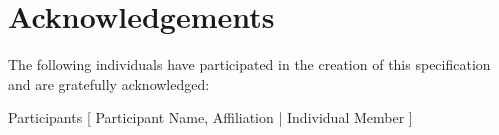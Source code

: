 \chapter{Acknowledgements}

The following individuals have participated in the creation of this specification and are gratefully acknowledged:

\begin{oasistitlesection}{Participants}
	[ Participant Name, Affiliation | Individual Member ] \newline
\end{oasistitlesection}
